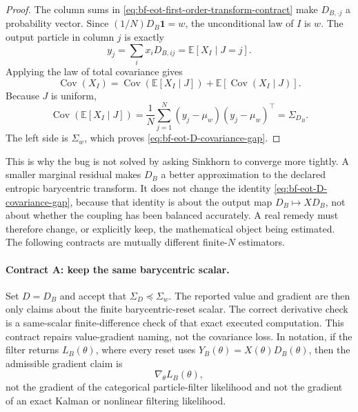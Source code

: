 \begin{proof}
The column sums in \eqref{eq:bf-eot-first-order-transform-contract} make
\(D_{B,\cdot j}\) a probability vector.  Since
\((1/N)D_B\mathbf 1=w\), the unconditional law of \(I\) is \(w\).  The output
particle in column \(j\) is exactly
\[
  y_j=\sum_i x_iD_{B,ij}=\mathbb E[X_I\mid J=j].
\]
Applying the law of total covariance gives
\[
  \operatorname{Cov}(X_I)
  =
  \operatorname{Cov}(\mathbb E[X_I\mid J])
  +
  \mathbb E[\operatorname{Cov}(X_I\mid J)].
\]
Because \(J\) is uniform,
\[
  \operatorname{Cov}(\mathbb E[X_I\mid J])
  =
  \frac1N\sum_{j=1}^N (y_j-\mu_w)(y_j-\mu_w)^\top
  =
  \Sigma_{D_B}.
\]
The left side is \(\Sigma_w\), which proves \eqref{eq:bf-eot-D-covariance-gap}.
\end{proof}

This is why the bug is not solved by asking Sinkhorn to converge more tightly.
A smaller marginal residual makes \(D_B\) a better approximation to the declared
entropic barycentric transform.  It does not change the identity
\eqref{eq:bf-eot-D-covariance-gap}, because that identity is about the output
map \(D_B\mapsto XD_B\), not about whether the coupling has been balanced
accurately.  A real remedy must therefore change, or explicitly keep, the
mathematical object being estimated.  The following contracts are mutually
different finite-\(N\) estimators.

\paragraph{Contract A: keep the same barycentric scalar.}
Set \(D=D_B\) and accept that \(\Sigma_D\preceq\Sigma_w\).  The reported value and
gradient are then only claims about the finite barycentric-reset scalar.  The
correct derivative check is a same-scalar finite-difference check of that exact
executed computation.  This contract repairs value-gradient naming, not the
covariance loss.  In notation, if the filter returns \(L_B(\theta)\), where every
reset uses \(Y_B(\theta)=X(\theta)D_B(\theta)\), then the admissible gradient
claim is
\[
  \nabla_\theta L_B(\theta),
\]
not the gradient of the categorical particle-filter likelihood and not the
gradient of an exact Kalman or nonlinear filtering likelihood.


